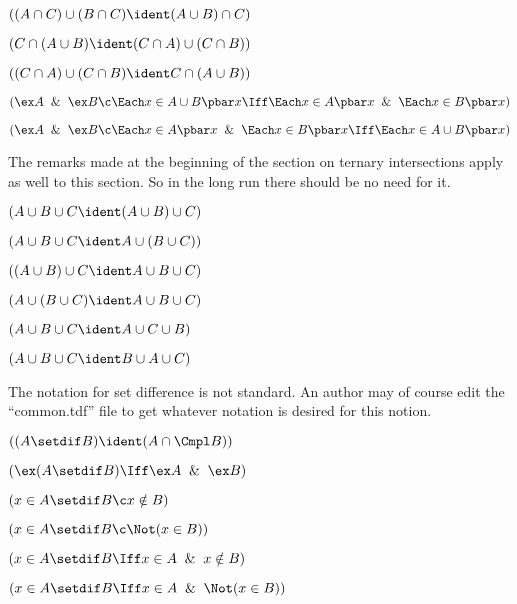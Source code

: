 $((A \cap C)\cup(B\cap C)\ident(A \cup B)\cap C)$

 $(C \cap (A \cup B)\ident (C\cap A)\cup(C\cap B))$

 $((C \cap A )\cup(C\cap B)\ident C\cap(A \cup B))$

 $(\ex A \And \ex B \c \Each x \in A \cup B \pbar x\Iff  \Each x \in A \pbar x
\And \Each x \in B \pbar x)$

 $(\ex A \And \ex B \c  \Each x \in A \pbar x \And \Each x \in B \pbar x\Iff  
\Each x \in A \cup B \pbar x)$

\lineb


The remarks made at the beginning of the section on ternary intersections
apply as well to this section.  So in the long run there should be no need for it.
\lineb


 $(A\cup B \cup C \ident (A \cup B) \cup C)$


 $(A\cup B \cup C \ident A \cup (B \cup C))$

 $((A\cup B) \cup C \ident A \cup B \cup C)$

 $(A\cup (B \cup C) \ident A \cup B \cup C)$

 $(A\cup  B \cup C  \ident A \cup C \cup B)$

 $(A\cup  B \cup C  \ident B \cup A \cup C)$

\lineb


The notation for set difference is not standard.  An author may of course
edit the ``common.tdf'' file to get whatever notation is desired for this notion.
\lineb


 $((A \setdif B) \ident (A \cap \Cmpl B))$


 $(\ex(A\setdif B)\Iff \ex A \And \ex B)$

 $(x \in A \setdif B \c x \notin B)$

 $(x \in A \setdif B \c \Not(x \in B))$

 $(x\in A\setdif B \Iff x \in A\And x\notin B)$

 $(x\in A\setdif B \Iff x \in A\And \Not(x\in B))$

